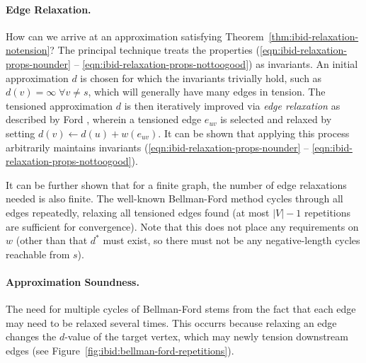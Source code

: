 \paragraph{Edge Relaxation.}
How can we arrive at an approximation
satisfying Theorem~\ref{thm:ibid-relaxation-notension}?
The principal technique treats the properties
(\ref{eqn:ibid-relaxation-props-nounder} --
\ref{eqn:ibid-relaxation-props-nottoogood}) as invariants.
An initial approximation $d$ is chosen for which the invariants
trivially hold,
such as $d(v) = \infty \;\forall v \neq s$,
which will generally have many edges in tension.
The tensioned approximation $d$ is then iteratively improved
via \emph{edge relaxation}
as described by Ford \citep{ford1955networkflowtheory},
wherein a tensioned edge $e_{uv}$ is selected and relaxed
by setting $d(v) \leftarrow d(u) + w(e_{uv})$.
It can be shown that applying this process arbitrarily
maintains invariants
(\ref{eqn:ibid-relaxation-props-nounder} --
\ref{eqn:ibid-relaxation-props-nottoogood}).

It can be further shown that for a finite graph,
the number of edge relaxations needed is also finite.
The well-known Bellman-Ford method
\citep{shimbel1955communicationnets, bellman1958routing,
moore1959spmaze}
cycles through all edges repeatedly,
relaxing all tensioned edges found
(at most $|V|-1$ repetitions are sufficient for convergence).
Note that this does not place any requirements on $w$
(other than that $d^*$ must exist, so there must not be
any negative-length cycles reachable from $s$).

\paragraph{Approximation Soundness.}
The need for multiple cycles of Bellman-Ford stems from the fact
that each edge may need to be relaxed several times.
This occurrs because relaxing an edge changes the
$d$-value of the target vertex,
which may newly tension downstream edges
(see Figure~\ref{fig:ibid:bellman-ford-repetitions}).

